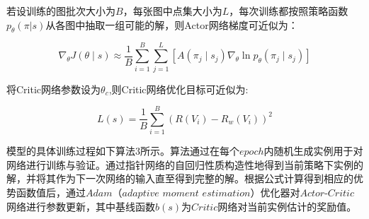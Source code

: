 \documentclass[AutoFakeBold]{LZUThesis}
\begin{document}
若设训练的图批次大小为$B$，每张图中点集大小为$L$，每次训练都按照策略函数$p_\theta(\pi|s)$从各图中抽取一组可能的解，则Actor网络梯度可近似为：

\begin{equation}
	\nabla_{\theta} J(\theta \mid s) \approx \frac{1}{B} \sum_{i=1}^{B} \sum_{j=1}^{L} \left[ A(\pi_j \mid s_j) \nabla_{\theta} \ln p_{\theta}(\pi_j \mid s_j) \right]
	\label{eq:18}
\end{equation}

将Critic网络参数设为$\theta_c$,则Critic网络优化目标可近似为:

\begin{equation}
	L(s) = \frac{1}{B} \sum_{i=1}^{B} \left( R(V_i) - R_w(V_i) \right)^2
	\label{eq:19}
\end{equation}

模型的具体训练过程如下算法$3$所示。算法通过在每个$epoch$内随机生成实例用于对网络进行训练与验证。通过指针网络的自回归性质构造性地得到当前策略下实例的解，并将其作为下一次网络的输入直至得到完整的解。根据公式计算得到相应的优势函数值后，通过$Adam$（$adaptive$ $moment$ $estimation$）优化器\cite{kingma2014adam}对$Actor$-$Critic$网络进行参数更新，其中基线函数$b(s)$为$Critic$网络对当前实例估计的奖励值。


\end{document}
